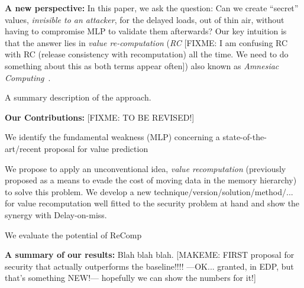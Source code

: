 \noindent \textbf{A new perspective:} In this paper, we ask the question: Can we create ``secret'' values, \emph{invisible to an attacker}, for the delayed loads, out of thin air, without having to compromise MLP to validate them afterwards? Our key intuition is that the answer lies in \emph{value re-computation} (\emph{RC}
{\color{red} [FIXME: I am confusing RC with RC (release consistency with recomputation) all the time. We need to do something about this as both terms appear often]}) also known as \emph{Amnesiac Computing}~\cite{}.

A summary description of the approach.

\noindent \textbf{Our Contributions:} {\color{red} [FIXME: TO BE REVISED!]}
\squishlist
\item We identify the fundamental weakness (MLP) concerning a state-of-the-art/recent proposal for value prediction 
\item We propose to apply an unconventional idea, \emph{value recomputation} (previously proposed as a means to evade the cost of moving data in the memory hierarchy) to solve this problem. We develop a new technique/version/solution/method/... for value recomputation well fitted to the security problem at hand and show the synergy with Delay-on-miss.
\item We evaluate the potential of ReComp 
\squishend

\noindent \textbf{A summary of our results:} Blah blah blah. {\color{red} [MAKEME: FIRST proposal for security that actually outperforms the baseline!!!! ---OK... granted, in EDP, but that's something NEW!--- hopefully we can show the numbers for it!]}






